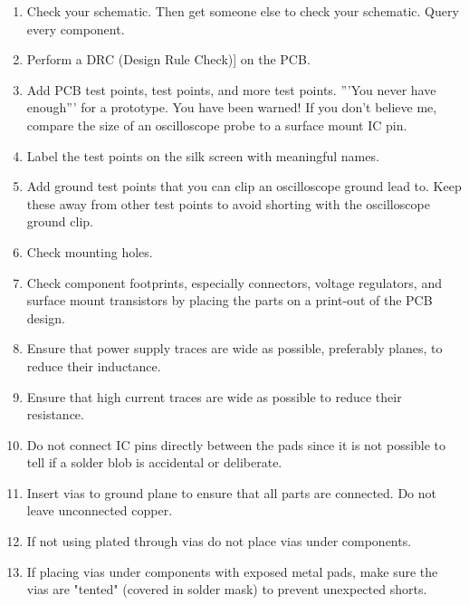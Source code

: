 \begin{enumerate}
\item Check your schematic.  Then get someone else to check your
  schematic.  Query every component.

\item Perform a DRC (Design Rule Check)] on the PCB.
  
\item Add PCB test points, test points, and more test points.  '''You
  never have enough''' for a prototype.  You have been warned!  If you
  don't believe me, compare the size of an oscilloscope probe to a
  surface mount IC pin.
  
\item Label the test points on the silk screen with meaningful names.
  
\item Add ground test points that you can clip an oscilloscope ground
  lead to.  Keep these away from other test points to avoid shorting
  with the oscilloscope ground clip.
  
\item Check mounting holes.
  
\item Check component footprints, especially connectors, voltage
  regulators, and surface mount transistors by placing the parts on a
  print-out of the PCB design.
  
\item Ensure that power supply traces are wide as possible, preferably
  planes, to reduce their inductance.
  
\item Ensure that high current traces are wide as possible to reduce their resistance.
  
\item Do not connect IC pins directly between the pads since it is not
  possible to tell if a solder blob is accidental or deliberate.

\item Insert vias to ground plane to ensure that all parts are connected.  Do not leave unconnected copper.
  
\item If not using plated through vias do not place vias under
  components.
  
\item If placing vias under components with exposed metal pads, make
  sure the vias are "tented" (covered in solder mask) to prevent
  unexpected shorts.
  

\end{enumerate}

